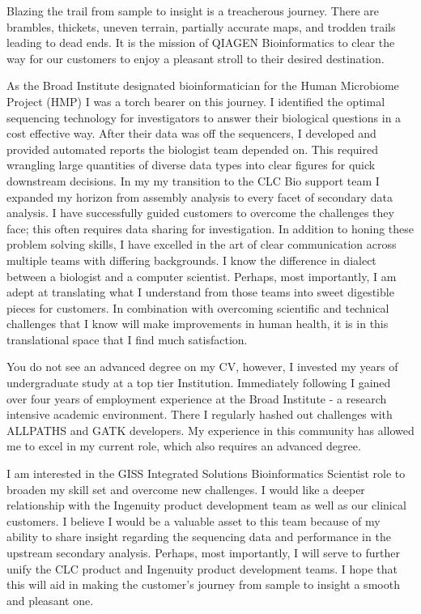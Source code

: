 \documentclass[10pt,letterpaper,dateno,sigright]{newlfm} %
\begin{document}
\begin{newlfm}


Blazing the trail from sample to insight is a treacherous journey. There are brambles, thickets, uneven terrain, partially accurate maps, and trodden trails leading to dead ends. It is the mission of QIAGEN Bioinformatics to clear the way for our customers to enjoy a pleasant stroll to their desired destination.

As the Broad Institute designated bioinformatician for the Human Microbiome Project (HMP) I was a torch bearer on this journey. I identified the optimal sequencing technology for investigators to answer their biological questions in a cost effective way.  After their data was off the sequencers, I developed and provided automated reports the biologist team depended on. This required wrangling large quantities of diverse data types into clear figures for quick downstream decisions. In my my transition to the CLC Bio support team I expanded my horizon from assembly analysis to every facet of secondary data analysis. I have successfully guided customers to overcome the challenges they face; this often requires data sharing for investigation. In addition to honing these problem solving skills, I have excelled in the art of clear communication across multiple teams with differing backgrounds. I know the difference in dialect between a biologist and a computer scientist. Perhaps, most importantly, I am adept at translating what I understand from those teams into sweet digestible pieces for customers. In combination with overcoming scientific and technical challenges that I know will make improvements in human health, it is in this translational space that I find much satisfaction. 

You do not see an advanced degree on my CV, however, I invested my years of undergraduate study at a top tier Institution. Immediately following I gained over four years of employment experience at the Broad Institute - a research intensive academic environment. There I regularly hashed out challenges with ALLPATHS and GATK developers. My experience in this community has allowed me to excel in my current role, which also requires an advanced degree. 

I am interested in the GISS Integrated Solutions Bioinformatics Scientist role to broaden my skill set and overcome new challenges. I would like a deeper relationship with the Ingenuity product development team as well as our clinical customers. I believe I would be a valuable asset to this team because of my ability to share insight regarding the sequencing data and performance in the upstream secondary analysis. Perhaps, most importantly, I will serve to further unify the CLC product and Ingenuity product development teams. I hope that this will aid in making the customer's journey from sample to insight a smooth and pleasant one.


\end{newlfm}
\end{document}
